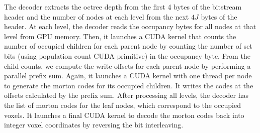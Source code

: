 The decoder extracts the octree depth from the first 4 bytes of the bitstream header and the number of nodes at each level from the next $4J$ bytes of the header.
%
At each level, the decoder reads the occupancy bytes for all nodes at that level from GPU memory.
%
Then, it launches a CUDA kernel that counts the number of occupied children for each parent node by counting the number of set bits (using population count CUDA primitive) in the occupancy byte.
%
From the child counts, we compute the write offsets for each parent node by performing a parallel prefix sum.
%
Again, it launches a CUDA kernel with one thread per node to generate the morton codes for its occupied children.
%
It writes the codes at the offsets calculated by the prefix sum.
%
After processing all levels, the decoder has the list of morton codes for the leaf nodes, which correspond to the occupied voxels.
%
It launches a final CUDA kernel to decode the morton codes back into integer voxel coordinates by reversing the bit interleaving.


